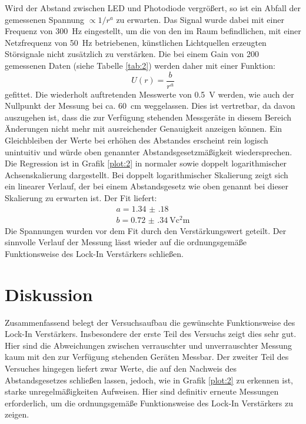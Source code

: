 Wird der Abstand zwischen LED und Photodiode vergrößert, so ist ein Abfall der gemessenen Spannung $\propto 1/r^a$ zu erwarten.
Das Signal wurde dabei mit einer Frequenz von \SI{300}{\hertz} eingestellt, um die von den im Raum
befindlichen, mit einer Netzfrequenz von \SI{50}{\hertz} betriebenen, künstlichen Lichtquellen erzeugten
Störsignale nicht zusätzlich zu verstärken. Die bei einem Gain von 200 gemessenen Daten
(siehe Tabelle \ref{tab:2}) werden daher mit einer Funktion:
\begin{equation}
  U(r) = \frac{b}{r^a}
\end{equation}
gefittet. Die wiederholt auftretenden Messwerte von \SI{0.5}{\volt} werden, wie auch der Nullpunkt der Messung bei ca. \SI{60}{\centi\metre}
weggelassen. Dies ist vertretbar, da davon auszugehen ist, dass die zur Verfügung stehenden Messgeräte in diesem Bereich Änderungen nicht
mehr mit ausreichender Genauigkeit anzeigen können. Ein Gleichbleiben der Werte bei erhöhen des Abstandes
erscheint rein logisch unintuitiv und würde oben genannter Abstandsgesetzmäßigkeit wiedersprechen. Die Regression ist
in Grafik \ref{plot:2} in normaler sowie doppelt logarithmischer Achsenskalierung dargestellt.
Bei doppelt logarithmischer Skalierung zeigt sich ein linearer Verlauf, der bei einem Abstandsgesetz wie oben genannt
bei dieser Skalierung zu erwarten ist. Der Fit liefert:
\begin{equation*}
  \begin{split}
    a = \num{1.34(18)}\\
    b = \SI{0.72(34)}{\volt\square\centi\metre}
  \end{split}
\end{equation*}
Die Spannungen wurden vor dem Fit durch den Verstärkungswert geteilt. Der sinnvolle Verlauf der Messung
lässt wieder auf die ordnungsgemäße Funktionsweise des Lock-In Verstärkers schließen.
\section{Diskussion}
Zusammenfassend belegt der Versuchsaufbau die gewünschte Funktionsweise des Lock-In Verstärkers. Insbesondere der erste Teil
des Versuchs zeigt dies sehr gut. Hier sind die Abweichungen zwischen verrauschter und unverrauschter Messung kaum mit
den zur Verfügung stehenden Geräten Messbar. Der zweiter Teil des Versuches hingegen liefert zwar
Werte, die auf den Nachweis des Abstandsgesetzes schließen lassen, jedoch, wie in Grafik \ref{plot:2} zu erkennen ist,
starke unregelmäßigkeiten Aufweisen. Hier sind definitiv erneute Messungen erforderlich, um
die ordnungsgemäße Funktionsweise des Lock-In Verstärkers zu zeigen.

